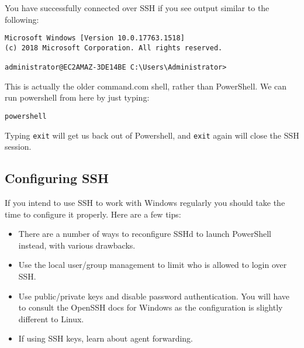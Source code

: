 \documentclass{pgnotes}
\begin{document}
You have successfully connected over SSH if you see output similar to
the following:

\begin{verbatim}
Microsoft Windows [Version 10.0.17763.1518]
(c) 2018 Microsoft Corporation. All rights reserved.

administrator@EC2AMAZ-3DE14BE C:\Users\Administrator>
\end{verbatim}

This is actually the older command.com shell, rather than PowerShell. We
can run powershell from here by just typing:

\begin{verbatim}
powershell
\end{verbatim}

Typing \texttt{exit} will get us back out of Powershell, and
\texttt{exit} again will close the SSH session.

\subsection{Configuring SSH}\label{configuring-ssh}

If you intend to use SSH to work with Windows regularly you should take
the time to configure it properly. Here are a few tips:

\begin{itemize}
\item
  There are a number of ways to reconfigure SSHd to launch PowerShell
  instead, with various drawbacks.
\item
  Use the local user/group management to limit who is allowed to login
  over SSH.
\item
  Use public/private keys and disable password authentication. You will
  have to consult the OpenSSH docs for Windows as the configuration is
  slightly different to Linux.
\item
  If using SSH keys, learn about agent forwarding.
\end{itemize}
\end{document}
